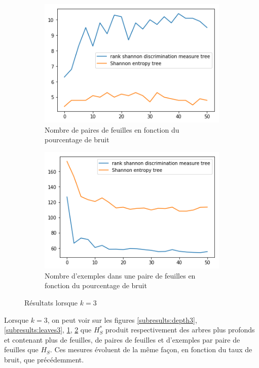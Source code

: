 \documentclass[a4paper]{article}
\begin{document}
\begin{figure}[H]
    \begin{subfigure}[c]{0.46\textwidth}
        \centering
        \includegraphics[width=\textwidth]{images/nbpairs_3.png}
        \caption{Nombre de paires de feuilles en fonction du pourcentage de bruit}
    \label{subresults:pairs3}
    \end{subfigure}
    \begin{subfigure}[c]{0.46\textwidth}
        \centering
        \includegraphics[width=\textwidth]{images/nbexamples_3.png}
        \caption{Nombre d'exemples dans une paire de feuilles en fonction du pourcentage de bruit}
    \label{subresults:ex3}
    \end{subfigure}

    \caption{Résultats lorsque $k=3$}
    \label{results:artificial3}
\end{figure}


Lorsque $k=3$, on peut voir sur les figures \ref{subresults:depth3},
\ref{subresults:leaves3}, \ref{subresults:pairs3}, \ref{subresults:ex3} que
$H^*_S$ produit respectivement des arbres plus profonds et contenant plus de
feuilles, de paires de feuilles et d'exemples par paire de feuilles que $H_S$.
Ces mesures évoluent de la même façon, en fonction du taux de bruit, que
précédemment.
\end{document}
